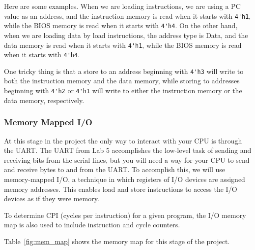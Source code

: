 Here are some examples.
When we are loading instructions, we are using a PC value as an address, and the instruction memory is read when it starts with \verb|4'h1|, while the BIOS memory is read when it starts with \verb|4'h4|.
On the other hand, when we are loading data by load instructions, the address type is Data, and the data memory is read when it starts with \verb|4'h1|, while the BIOS memory is read when it starts with \verb|4'h4|.

One tricky thing is that a store to an address beginning with \verb|4'h3| will write to both the instruction memory and the data memory, while storing to addresses beginning with \verb|4'h2| or \verb|4'h1| will write to either the instruction memory or the data memory, respectively.

\subsubsection{Memory Mapped I/O}
At this stage in the project the only way to interact with your CPU is through the UART.
The UART from Lab 5 accomplishes the low-level task of sending and receiving bits from the serial lines, but you will need a way for your CPU to send and receive bytes to and from the UART.
To accomplish this, we will use memory-mapped I/O, a technique in which registers of I/O devices are assigned memory addresses.
This enables load and store instructions to access the I/O devices as if they were memory.

To determine CPI (cycles per instruction) for a given program, the I/O memory map is also used to include instruction and cycle counters.

Table~\ref{fig:mem_map} shows the memory map for this stage of the project.

